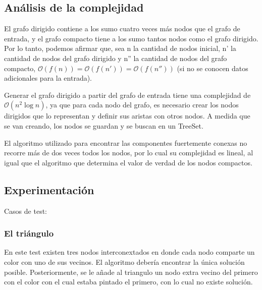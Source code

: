 \subsection{Análisis de la complejidad}
El grafo dirigido contiene a los sumo cuatro veces más nodos que el grafo de entrada, y el grafo compacto tiene a los sumo tantos nodos como el grafo dirigido. Por lo tanto, podemos afirmar que, sea n la cantidad de nodos inicial, n' la cantidad de nodos del grafo dirigido y n'' la cantidad de nodos del grafo compacto, $\mathcal{O}(f(n)) = \mathcal{O}(f(n')) = \mathcal{O}(f(n''))$ (si no se conocen datos adicionales para la entrada).

Generar el grafo dirigido a partir del grafo de entrada tiene una complejidad de $\mathcal{O}(n^2\log{n})$, ya que para cada nodo del grafo, es necesario crear los nodos dirigidos que lo representan y definir sus aristas con otros nodos. A medida que se van creando, los nodos se guardan y se buscan en un TreeSet.

El algoritmo utilizado para encontrar las componentes fuertemente conexas no recorre más de dos veces todos los nodos, por lo cual su complejidad es lineal, al igual que el algoritmo que determina el valor de verdad de los nodos compactos.


% 
% 

\subsection{Experimentación}
Casos de test:
\subsubsection{El triángulo}
En este test existen tres nodos interconextados en donde cada nodo comparte un color con uno de sus vecinos. El algoritmo debería encontrar la única solución posible.
Posteriormente, se le añade al triangulo un nodo extra vecino del primero con el color con el cual estaba pintado el primero, con lo cual no existe solución.

